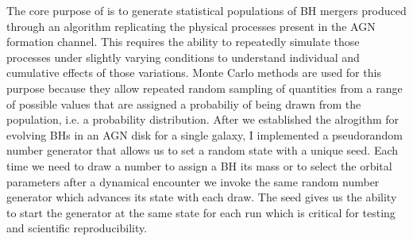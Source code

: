 The core purpose of \mcfacts is to generate statistical populations of BH mergers produced through an algorithm replicating the physical processes present in the AGN formation channel.
This requires the ability to repeatedly simulate those processes under slightly varying conditions to understand individual and cumulative effects of those variations.
Monte Carlo methods are used for this purpose because they allow repeated random sampling of quantities from a range of possible values that are assigned a probabiliy of being drawn from the population, i.e. a probability distribution.
After we established the alrogithm for evolving BHs in an AGN disk for a single galaxy, I implemented a pseudorandom number generator that allows us to set a random state with a unique seed.
Each time we need to draw a number to assign a BH its mass or to select the orbital parameters after a dynamical encounter we invoke the same random number generator which advances its state with each draw.
The seed gives us the ability to start the generator at the same state for each run which is critical for testing and scientific reproducibility.


